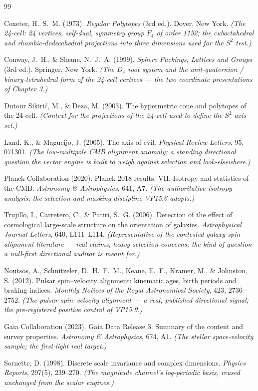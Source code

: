 \documentclass[11pt, letterpaper, openany]{book}
\begin{document}
\begin{thebibliography}{99}

Coxeter, H.~S.~M. (1973).
\textit{Regular Polytopes} (3rd ed.). Dover, New York.
\textit{(The 24-cell: 24 vertices, self-dual, symmetry group $F_4$ of order 1152; the cuboctahedral and
rhombic-dodecahedral projections into three dimensions used for the $S^2$ test.)}

Conway, J.~H., \& Sloane, N.~J.~A. (1999).
\textit{Sphere Packings, Lattices and Groups} (3rd ed.). Springer, New York.
\textit{(The $D_4$ root system and the unit-quaternion / binary-tetrahedral form of the 24-cell vertices ---
the two coordinate presentations of Chapter 3.)}

Dutour Sikiri\'c, M., \& Deza, M. (2003).
The hypermetric cone and polytopes of the 24-cell.
\textit{(Context for the projections of the 24-cell used to define the $S^2$ axis set.)}


Land, K., \& Magueijo, J. (2005).
The axis of evil.
\textit{Physical Review Letters}, 95, 071301.
\textit{(The low-multipole CMB alignment anomaly; a standing directional question the vector engine is built
to weigh against selection and look-elsewhere.)}

Planck Collaboration (2020).
Planck 2018 results. VII. Isotropy and statistics of the CMB.
\textit{Astronomy \& Astrophysics}, 641, A7.
\textit{(The authoritative isotropy analysis; the selection and masking discipline VP15.6 adopts.)}

Trujillo, I., Carretero, C., \& Patiri, S.~G. (2006).
Detection of the effect of cosmological large-scale structure on the orientation of galaxies.
\textit{Astrophysical Journal Letters}, 640, L111--L114.
\textit{(Representative of the contested galaxy spin-alignment literature --- real claims, heavy selection
concerns; the kind of question a null-first directional auditor is meant for.)}

Noutsos, A., Schnitzeler, D.~H.~F.~M., Keane, E.~F., Kramer, M., \& Johnston, S. (2012).
Pulsar spin--velocity alignment: kinematic ages, birth periods and braking indices.
\textit{Monthly Notices of the Royal Astronomical Society}, 423, 2736--2752.
\textit{(The pulsar spin--velocity alignment --- a real, published directional signal; the pre-registered
positive control of VP15.9.)}

Gaia Collaboration (2023).
Gaia Data Release 3: Summary of the content and survey properties.
\textit{Astronomy \& Astrophysics}, 674, A1.
\textit{(The stellar space-velocity sample; the first-light real target.)}

Sornette, D. (1998).
Discrete scale invariance and complex dimensions.
\textit{Physics Reports}, 297(5), 239--270.
\textit{(The magnitude channel's log-periodic basis, reused unchanged from the scalar engines.)}

\end{thebibliography}
\end{document}
